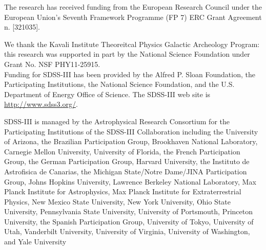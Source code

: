 \documentclass[12pt, preprint]{aastex}
\begin{document}
The research has received funding from the European Research Council under the European Union's Seventh Framework Programme (FP 7) ERC Grant Agreement n.
[321035].
  
We thank the Kavali Institute Theoreitcal Physics Galactic Archeology Program: this research was supported in part by the National Science Foundation under Grant No. NSF PHY11-25915.\\
 
Funding for SDSS-III has been provided by the Alfred P. Sloan Foundation, the Participating Institutions, 
the National Science Foundation, and the U.S. Department of Energy Office of Science. The SDSS-III web site is \url{http://www.sdss3.org/}.

SDSS-III is managed by the Astrophysical Research Consortium for the Participating Institutions of the SDSS-III Collaboration
 including the University of Arizona, the Brazilian Participation Group, Brookhaven National Laboratory, Carnegie Mellon University, 
 University of Florida, the French Participation Group, the German Participation Group, Harvard University, the Instituto de Astrofisica 
 de Canarias, the Michigan State/Notre Dame/JINA Participation Group, Johns Hopkins University, Lawrence Berkeley National Laboratory, 
 Max Planck Institute for Astrophysics, Max Planck Institute for Extraterrestrial Physics, New Mexico State University, New York University, 
 Ohio State University, Pennsylvania State University, University of Portsmouth, Princeton University, the Spanish Participation Group, 
 University of Tokyo, University of Utah, Vanderbilt University, University of Virginia, University of Washington, and Yale University


\end{document}
